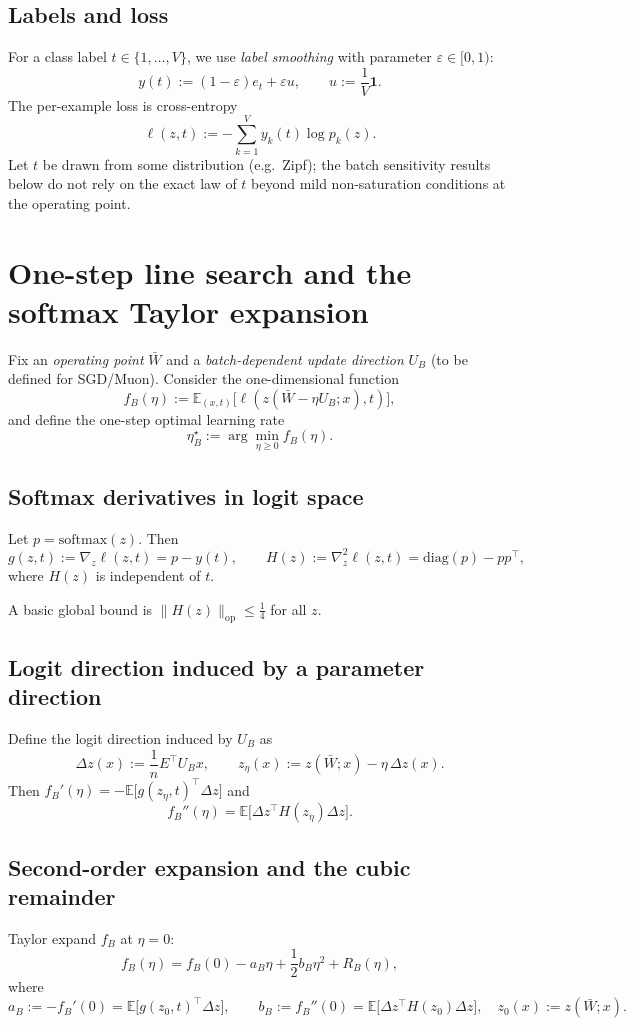 \documentclass[11pt]{article}
\begin{document}
\subsection{Labels and loss}
For a class label $t\in\{1,\dots,V\}$, we use \emph{label smoothing} with parameter $\varepsilon\in[0,1)$:
\[
y(t) := (1-\varepsilon)e_t + \varepsilon u,
\qquad
u:=\frac{1}{V}\mathbf{1}.
\]
The per-example loss is cross-entropy
\[
\ell(z,t):= -\sum_{k=1}^V y_k(t)\log p_k(z).
\]
Let $t$ be drawn from some distribution (e.g.\ Zipf); the batch sensitivity results below do not rely on the exact law of $t$
beyond mild non-saturation conditions at the operating point.

\section{One-step line search and the softmax Taylor expansion}

Fix an \emph{operating point} $\bar W$ and a \emph{batch-dependent update direction} $U_B$ (to be defined for SGD/Muon).
Consider the one-dimensional function
\[
f_B(\eta) := \mathbb{E}_{(x,t)}\big[\ell(z(\bar W-\eta U_B;x),t)\big],
\]
and define the one-step optimal learning rate
\[
\eta_B^\star := \arg\min_{\eta\ge 0} f_B(\eta).
\]

\subsection{Softmax derivatives in logit space}
Let $p=\mathrm{softmax}(z)$. Then
\[
g(z,t):=\nabla_z \ell(z,t)=p-y(t),
\qquad
H(z):=\nabla_z^2 \ell(z,t)=\mathrm{diag}(p)-pp^\top,
\]
where $H(z)$ is independent of $t$.

A basic global bound is $\|H(z)\|_{\mathrm{op}}\le \tfrac14$ for all $z$.

\subsection{Logit direction induced by a parameter direction}
Define the logit direction induced by $U_B$ as
\[
\Delta z(x) := \frac{1}{n}E^\top U_B x,
\qquad
z_\eta(x) := z(\bar W;x) - \eta\,\Delta z(x).
\]
Then $f_B'(\eta)= -\mathbb{E}\big[g(z_\eta,t)^\top \Delta z\big]$ and
\[
f_B''(\eta)= \mathbb{E}\big[\Delta z^\top H(z_\eta)\Delta z\big].
\]

\subsection{Second-order expansion and the cubic remainder}
Taylor expand $f_B$ at $\eta=0$:
\[
f_B(\eta)= f_B(0) - a_B \eta + \frac12 b_B \eta^2 + R_B(\eta),
\]
where
\[
a_B := -f_B'(0)=\mathbb{E}\big[g(z_0,t)^\top \Delta z\big],
\qquad
b_B := f_B''(0)=\mathbb{E}\big[\Delta z^\top H(z_0)\Delta z\big],
\quad z_0(x):=z(\bar W;x).
\]
\end{document}
